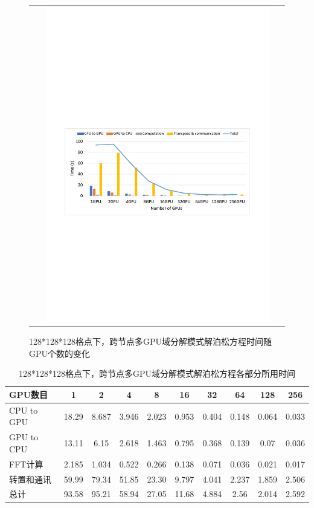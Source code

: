 \begin{figure}[!htb]
  \centering
  \begin{tabular}{|l|l|}
    \multicolumn{2}{c}{
    \includegraphics[width=0.9\textwidth]{Img/domain_decomposition_Titan128.pdf}} \\
  \end{tabular}
  \caption{128*128*128格点下，跨节点多GPU域分解模式解泊松方程时间随GPU个数的变化}
  \label{fig:TITAN_GPU_Poisson128}
\end{figure}

\begin{table}
  \centering
  \begin{tabular}{|>{\small}l|c|c|c|c|c|c|c|c|c|}
    \hline
    GPU数目	    &1	    &2	    &4	    &8 	    &16	    &32  	&64     &128	&256   \\
    \hline
    CPU to GPU	&18.29	&8.687	&3.946	&2.023	&0.953	&0.404	&0.148	&0.064	&0.033 \\
    GPU to CPU	&13.11	&6.15	&2.618	&1.463	&0.795	&0.368	&0.139	&0.07	&0.036 \\
    FFT计算  	&2.185	&1.034	&0.522	&0.266	&0.138	&0.071	&0.036	&0.021	&0.017 \\
    转置和通讯	&59.99	&79.34	&51.85	&23.30	&9.797	&4.041	&2.237	&1.859	&2.506 \\
    总计	    &93.58	&95.21	&58.94	&27.05	&11.68	&4.884	&2.56	&2.014	&2.592\\
    \hline
  \end{tabular}
  \caption{128*128*128格点下，跨节点多GPU域分解模式解泊松方程各部分所用时间}
  \label{tab:TITAN_GPU_Poisson128}
\end{table}

